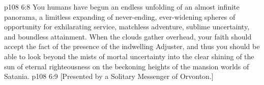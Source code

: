\vs p108 6:8 \pc You humans have begun an endless unfolding of an almost infinite panorama, a limitless expanding of never\hyp{}ending, ever\hyp{}widening spheres of opportunity for exhilarating service, matchless adventure, sublime uncertainty, and boundless attainment. When the clouds gather overhead, your faith should accept the fact of the presence of the indwelling Adjuster, and thus you should be able to look beyond the mists of mortal uncertainty into the clear shining of the sun of eternal righteousness on the beckoning heights of the mansion worlds of Satania.
\vsetoff
\vs p108 6:9 [Presented by a Solitary Messenger of Orvonton.]
\quizlink
